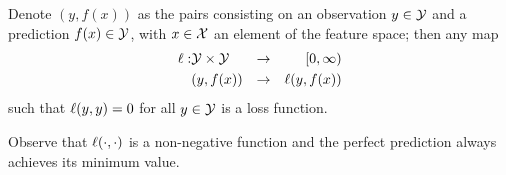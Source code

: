 \begin{definition}
    Denote $(y, f(x))$ as the pairs consisting on an observation $y \in \mathcal{Y}$ and a prediction $f(x) \in \mathcal{Y}$, with $x \in \mathcal{X}$ an element of the feature space; then any map
    \begin{equation}
        \begin{aligned}
    \nonumber
    \ell: &\mathcal{Y} \times \mathcal{Y} &\to &&[0, \infty) \\
    &(y, f(x)) &\to  && \ell(y, f(x)) 
\end{aligned}
\end{equation}
    such that $\ell(y, y) = 0$ for all $y \in \mathcal{Y}$ is a loss function.
\end{definition}
Observe that $\ell(\cdot, \cdot)$ is a non-negative function and the perfect prediction always achieves its minimum value.

